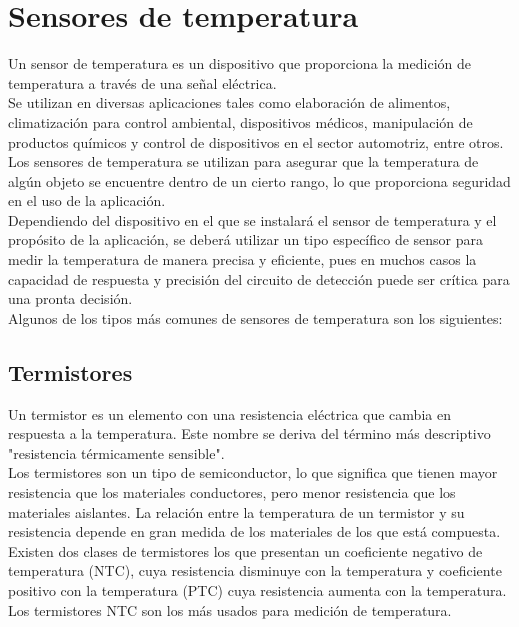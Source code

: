 	\section{Sensores de temperatura}
	Un sensor de temperatura es un dispositivo que proporciona la medición de temperatura a través de una señal eléctrica. \\
		
	Se utilizan en diversas aplicaciones tales como elaboración de alimentos, climatización para control ambiental, dispositivos médicos, manipulación de productos químicos y control de dispositivos en el sector automotriz, entre otros. \\
		
	Los sensores de temperatura se utilizan para asegurar que la temperatura de algún objeto se encuentre dentro de un cierto rango, lo que proporciona seguridad en el uso de la aplicación. \\
		
	Dependiendo del dispositivo en el que se instalará el sensor de temperatura y el propósito de la aplicación, se deberá utilizar un tipo específico de sensor para medir la temperatura de manera precisa y eficiente, pues en muchos casos la capacidad de respuesta y precisión del circuito de detección puede ser crítica para una pronta decisión.\\
	
	Algunos de los tipos más comunes de sensores de temperatura son los siguientes:
	
	\subsection{Termistores}
	Un termistor es un elemento con una resistencia eléctrica que cambia en respuesta a la temperatura. Este nombre se deriva del término más descriptivo "resistencia térmicamente sensible".\\
						
	Los termistores son un tipo de semiconductor, lo que significa que tienen mayor resistencia que los materiales conductores, pero menor resistencia que los materiales aislantes. La relación entre la temperatura de un termistor y su resistencia depende en gran medida de los materiales de los que está compuesta.\\
			
	Existen dos clases de termistores los que presentan un coeficiente negativo de temperatura (NTC), cuya resistencia disminuye con la temperatura y coeficiente positivo con la temperatura  (PTC) cuya resistencia aumenta con la temperatura. Los termistores NTC son los más usados para medición de temperatura.
			
